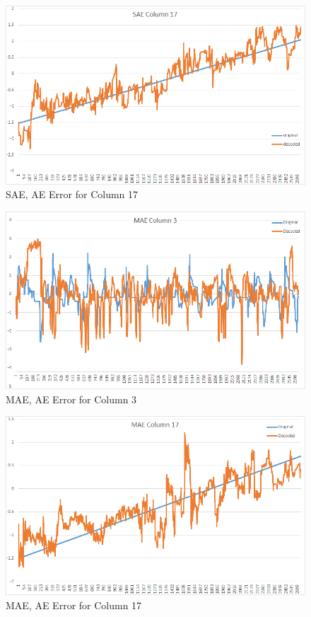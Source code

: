\documentclass[draft,dvipsnames]{drexel-thesis}
\begin{document}
\begin{thesis}
\begin{figure}[t!]
    \centering
    \includegraphics[width=\textwidth]{pictures/result_pictures/SAE_Column_17.png}
    \caption{SAE, AE Error for Column 17}
    \label{fig:sae_error_c17}
\end{figure}

\begin{figure}[t!]
    \centering
    \includegraphics[width=\textwidth]{pictures/result_pictures/MAE_Column_3.png}
    \caption{MAE, AE Error for Column 3}
    \label{fig:mae_error_c3}
\end{figure}

\begin{figure}[t!]
    \centering
    \includegraphics[width=\textwidth]{pictures/result_pictures/MAE_Column_17.png}
    \caption{MAE, AE Error for Column 17}
    \label{fig:mae_error_c17}
\end{figure}


\end{thesis}
\end{document}
